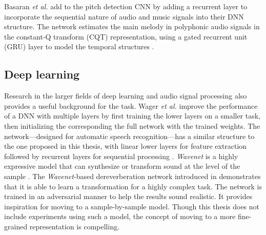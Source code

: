 Basaran {\it et al.} add to the pitch detection CNN by adding a recurrent layer to incorporate the sequential nature of audio and music signals into their DNN structure. The network estimates the main melody in polyphonic audio signals in the constant-Q transform (CQT) representation, using a gated recurrent unit (GRU) layer \cite{chung2014empirical, ChoK2014arxiv} to model the temporal structures \cite{basaranmain}. 

\subsection{Deep learning}
Research in the larger fields of deep learning and audio signal processing also provides a useful background for the task. Wager \textit{et al.} improve the performance of a DNN with multiple layers by first training the lower layers on a smaller task, then initializing the corresponding the full network with the trained weights. The network---designed for automatic speech recognition---has a similar structure to the one proposed in this thesis, with linear lower layers for feature extraction followed by recurrent layers for sequential processing \cite{wager2020fully}.
\textit{Wavenet} is a highly expressive model that can synthesize or transform sound at the level of the sample \cite{oord2016wavenet}. The \textit{Wavenet}-based dereverberation network introduced in \cite{su2020hifi} demonstrates that it is able to learn a transformation for a highly complex task. The network is trained in an adversarial manner \cite{goodfellow2014generative} to help the results sound realistic. It provides inspiration for moving to a sample-by-sample model. Though this thesis does not include experiments using such a model, the concept of moving to a more fine-grained representation is compelling.

